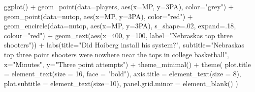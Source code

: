 \documentclass[
  letterpaper,
  DIV=11,
  numbers=noendperiod]{scrreprt}
\newenvironment{Shaded}{\begin{snugshade}}{\end{snugshade}}
\newcommand{\AttributeTok}[1]{\textcolor[rgb]{0.40,0.45,0.13}{#1}}
\newcommand{\DecValTok}[1]{\textcolor[rgb]{0.68,0.00,0.00}{#1}}
\newcommand{\FunctionTok}[1]{\textcolor[rgb]{0.28,0.35,0.67}{#1}}
\newcommand{\NormalTok}[1]{\textcolor[rgb]{0.00,0.23,0.31}{#1}}
\newcommand{\SpecialCharTok}[1]{\textcolor[rgb]{0.37,0.37,0.37}{#1}}
\newcommand{\StringTok}[1]{\textcolor[rgb]{0.13,0.47,0.30}{#1}}
\begin{document}
\begin{Shaded}
\begin{Highlighting}[]
\FunctionTok{ggplot}\NormalTok{() }\SpecialCharTok{+} \FunctionTok{geom\_point}\NormalTok{(}\AttributeTok{data=}\NormalTok{players, }\FunctionTok{aes}\NormalTok{(}\AttributeTok{x=}\NormalTok{MP, }\AttributeTok{y=}\StringTok{\textasciigrave{}}\AttributeTok{3PA}\StringTok{\textasciigrave{}}\NormalTok{), }\AttributeTok{color=}\StringTok{"grey"}\NormalTok{) }\SpecialCharTok{+} \FunctionTok{geom\_point}\NormalTok{(}\AttributeTok{data=}\NormalTok{nutop, }\FunctionTok{aes}\NormalTok{(}\AttributeTok{x=}\NormalTok{MP, }\AttributeTok{y=}\StringTok{\textasciigrave{}}\AttributeTok{3PA}\StringTok{\textasciigrave{}}\NormalTok{), }\AttributeTok{color=}\StringTok{"red"}\NormalTok{) }\SpecialCharTok{+} \FunctionTok{geom\_encircle}\NormalTok{(}\AttributeTok{data=}\NormalTok{nutop, }\FunctionTok{aes}\NormalTok{(}\AttributeTok{x=}\NormalTok{MP, }\AttributeTok{y=}\StringTok{\textasciigrave{}}\AttributeTok{3PA}\StringTok{\textasciigrave{}}\NormalTok{), }\AttributeTok{s\_shape=}\NormalTok{.}\DecValTok{02}\NormalTok{, }\AttributeTok{expand=}\NormalTok{.}\DecValTok{18}\NormalTok{, }\AttributeTok{colour=}\StringTok{"red"}\NormalTok{) }\SpecialCharTok{+}
  \FunctionTok{geom\_text}\NormalTok{(}\FunctionTok{aes}\NormalTok{(}\AttributeTok{x=}\DecValTok{400}\NormalTok{, }\AttributeTok{y=}\DecValTok{100}\NormalTok{, }\AttributeTok{label=}\StringTok{"Nebraska\textquotesingle{}s top three shooters"}\NormalTok{)) }\SpecialCharTok{+} 
  \FunctionTok{labs}\NormalTok{(}\AttributeTok{title=}\StringTok{"Did Hoiberg install his system?"}\NormalTok{, }\AttributeTok{subtitle=}\StringTok{"Nebraska\textquotesingle{}s top three point shooters were nowhere near the tops in college basketball"}\NormalTok{, }\AttributeTok{x=}\StringTok{"Minutes"}\NormalTok{, }\AttributeTok{y=}\StringTok{"Three point attempts"}\NormalTok{) }\SpecialCharTok{+} 
  \FunctionTok{theme\_minimal}\NormalTok{() }\SpecialCharTok{+} 
  \FunctionTok{theme}\NormalTok{(}
    \AttributeTok{plot.title =} \FunctionTok{element\_text}\NormalTok{(}\AttributeTok{size =} \DecValTok{16}\NormalTok{, }\AttributeTok{face =} \StringTok{"bold"}\NormalTok{),}
    \AttributeTok{axis.title =} \FunctionTok{element\_text}\NormalTok{(}\AttributeTok{size =} \DecValTok{8}\NormalTok{), }
    \AttributeTok{plot.subtitle =} \FunctionTok{element\_text}\NormalTok{(}\AttributeTok{size=}\DecValTok{10}\NormalTok{), }
    \AttributeTok{panel.grid.minor =} \FunctionTok{element\_blank}\NormalTok{()}
\NormalTok{    )}
\end{Highlighting}
\end{Shaded}
\end{document}
